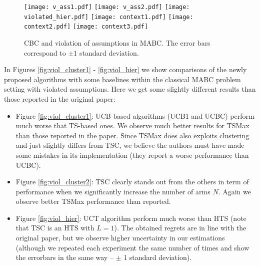 \begin{figure}[!t]
    \texttt{[image: v\_ass1.pdf]}
    \label{fig:viol_cluster1}
  \endminipage \hfill
    \texttt{[image: v\_ass2.pdf]}
    \label{fig:viol_cluster2}
  \endminipage \hfill
    \texttt{[image: violated\_hier.pdf]}
    \label{fig:viol_hier}
  \endminipage
  \vfill
    \texttt{[image: context1.pdf]}
    \label{fig:context1}
  \endminipage \hfill
    \texttt{[image: context2.pdf]}
    \label{fig:context2}
  \endminipage \hfill
    \texttt{[image: context3.pdf]}
    \label{fig:context3}
  \endminipage
  \caption{CBC and violation of assumptions in MABC. The error bars correspond to $\pm 1$ standard deviation.}
  \label{fig:exp2}
\end{figure}

In Figures \ref{fig:viol_cluster1} - \ref{fig:viol_hier} we show comparisons of the newly proposed algorithms with some baselines within the classical MABC problem setting with violated assumptions. Here we get some slightly different results than those reported in the original paper: 

\begin{itemize}
  \item Figure \ref{fig:viol_cluster1}: UCB-based algorithms (UCB1 and UCBC) perform much worse that TS-based ones. We observe much better results for TSMax than those reported in the paper. Since TSMax does also exploits clustering and just slightly differs from TSC, we believe the authors must have made some mistakes in its implementation (they report a worse performance than UCBC).
  \item Figure \ref{fig:viol_cluster2}: TSC clearly stands out from the others in term of performance when we significantly increase the number of arms $N$. Again we observe better TSMax performance than reported.
  \item Figure \ref{fig:viol_hier}: UCT algorithm perform much worse than HTS (note that TSC is an HTS with $L=1$). The obtained regrets are in line with the original paper, but we observe higher uncertainty in our estimations (although we repeated each experiment the same number of times and show the errorbars in the same way -- $\pm$ 1 standard deviation).
\end{itemize}


